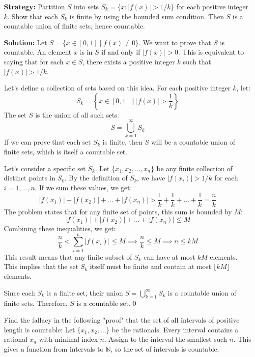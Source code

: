 \noindent\textbf{Strategy:} Partition $S$ into sets $S_k = \{x : |f(x)| > 1/k\}$ for each positive integer $k$. Show that each $S_k$ is finite by using the bounded sum condition. Then $S$ is a countable union of finite sets, hence countable.

\bigskip\noindent\textbf{Solution:}  
Let $S = \{x \in [0,1] \mid f(x) \ne 0\}$. We want to prove that $S$ is countable.
An element $x$ is in $S$ if and only if $|f(x)| > 0$.
This is equivalent to saying that for each $x \in S$, there exists a positive integer $k$ such that $|f(x)| > 1/k$.

Let's define a collection of sets based on this idea. For each positive integer $k$, let:
\[ S_k = \left\{ x \in [0,1] \mid |f(x)| > \frac{1}{k} \right\} \]
The set $S$ is the union of all such sets:
\[ S = \bigcup_{k=1}^{\infty} S_k \]
If we can prove that each set $S_k$ is finite, then $S$ will be a countable union of finite sets, which is itself a countable set.

Let's consider a specific set $S_k$. Let $\{x_1, x_2, \dots, x_n\}$ be any finite collection of distinct points in $S_k$.
By the definition of $S_k$, we have $|f(x_i)| > 1/k$ for each $i=1, \dots, n$.
If we sum these values, we get:
\[ |f(x_1)| + |f(x_2)| + \dots + |f(x_n)| > \frac{1}{k} + \frac{1}{k} + \dots + \frac{1}{k} = \frac{n}{k} \]
The problem states that for any finite set of points, this sum is bounded by $M$:
\[ |f(x_1)| + |f(x_2)| + \dots + |f(x_n)| \le M \]
Combining these inequalities, we get:
\[ \frac{n}{k} < \sum_{i=1}^n |f(x_i)| \le M \implies \frac{n}{k} \le M \implies n \le kM \]
This result means that any finite subset of $S_k$ can have at most $kM$ elements. This implies that the set $S_k$ itself must be finite and contain at most $\lfloor kM \rfloor$ elements.

Since each $S_k$ is a finite set, their union $S = \bigcup_{k=1}^{\infty} S_k$ is a countable union of finite sets. Therefore, $S$ is a countable set.\qed



\begin{problembox}
Find the fallacy in the following "proof" that the set of all intervals of positive length is countable:  
Let \( \{x_1, x_2, \ldots\} \) be the rationals. Every interval contains a rational \( x_n \) with minimal index \( n \).  
Assign to the interval the smallest such \( n \). This gives a function from intervals to \( \mathbb{N} \), so the set of intervals is countable.
\end{problembox}

